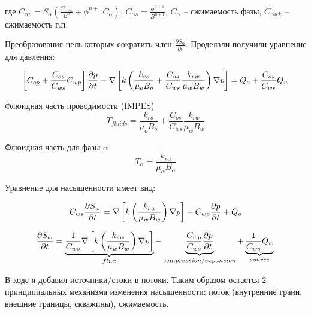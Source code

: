 \documentclass[14pt]{article}
\begin{document}
	
	где $C_{\alpha p} = S_{\alpha} \left( \frac{C_{rock}}{B^{n}} + \phi^{n+1} C_{\alpha} \right)$, $C_{\alpha s} = \frac{\phi^{n+1}}{B^{n+1}}$, $C_{\alpha}$ -- сжимаемость фазы, $C_{rock}$ -- сжимаемость г.п.

	Преобразования цель которых сократить член $\frac{\partial S_{\alpha}}{\partial t}$. Проделали получили уравнение для давления:
	
	\begin{equation}
		\left[ C_{op} + \frac{C_{os}}{C_{ws}} C_{wp} \right] \frac{\partial p}{\partial t} -
		\nabla \left[ k \left( \frac{k_{ro}}{\mu_{o} B_{o}} + \frac{C_{os}}{C_{ws}} \frac{k_{rw}}{\mu_{w} B_{w}} \right) \nabla p  \right] = Q_{o} + \frac{C_{os}}{C_{ws}} Q_{w} \\
	\end{equation}
	
	Флюидная часть проводимости (IMPES)
	\begin{equation}
		T_{fluids} = \frac{k_{ro}}{\mu_{o} B_{o}} + \frac{C_{os}}{C_{ws}} \frac{k_{rw}}{\mu_{w} B_{w}}
	\end{equation}
	
	Флюидная часть для фазы $\alpha$
	\begin{equation}
		T_{\alpha} = \frac{k_{r \alpha}}{\mu_{\alpha} B_{\alpha}} 
	\end{equation}
	
	Уравнение для насыщенности имеет вид:
	
	\begin{equation}
		C_{ws} \frac{\partial S_{w}}{\partial t} = 
		\nabla \left[ k \left( \frac{k_{rw}}{\mu_{w} B_{w}} \right) \nabla p \right] -
		C_{wp} \frac{\partial p}{\partial t} + 
		Q_{o} \\
	\end{equation}
	
	\begin{equation}
		\frac{\partial S_{w}}{\partial t} =  
		\underbrace{ \frac{1}{C_{ws}} 
		\nabla \left[ k \left( \frac{k_{rw}}{\mu_{w} B_{w}} \right) \nabla p \right] }_{flux} -
		\underbrace{ \frac{C_{wp}}{C_{ws}} \frac{\partial p}{\partial t} }_{compression/expansion} + 
		\underbrace{ \frac{1}{C_{ws}} Q_{w} }_{source} \\
	\end{equation}
	
	В коде я добавил источники/стоки в потоки. Таким образом остается 2 принципиальных механизма изменения насыщенности: поток (внутренние грани, внешние границы, скважины), сжимаемость.\\
	
\end{document}
